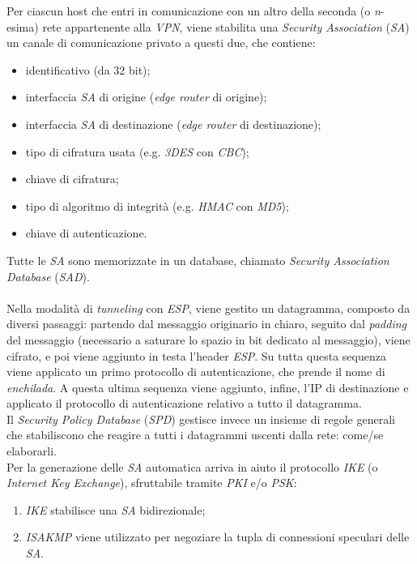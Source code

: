 Per ciascun host che entri in comunicazione con un altro della seconda (o \textit{n}-esima) rete appartenente alla \textit{VPN}, viene stabilita una \textit{Security Association} (\textit{SA}) un canale di comunicazione privato a questi due, che contiene:
\begin{itemize}
	\item identificativo (da 32 bit);
	\item interfaccia \textit{SA} di origine (\textit{edge router} di origine);
	\item interfaccia \textit{SA} di destinazione (\textit{edge router} di destinazione);
	\item tipo di cifratura usata (e.g. \textit{3DES} con \textit{CBC});
	\item chiave di cifratura;
	\item tipo di algoritmo di integrità (e.g. \textit{HMAC} con \textit{MD5});
	\item chiave di autenticazione.
\end{itemize}
Tutte le \textit{SA} sono memorizzate in un database, chiamato \textit{Security Association Database} (\textit{SAD}). \\ \\

Nella modalità di \textit{tunneling} con \textit{ESP}, viene gestito un datagramma, composto da diversi passaggi: partendo dal messaggio originario in chiaro, seguito dal \textit{padding} del messaggio (necessario a saturare lo spazio in bit dedicato al messaggio), viene cifrato, e poi viene aggiunto in testa l'header \textit{ESP}. Su tutta questa sequenza viene applicato un primo protocollo di autenticazione, che prende il nome di \textit{enchilada}. A questa ultima sequenza viene aggiunto, infine, l'IP di destinazione e applicato il protocollo di autenticazione relativo a tutto il datagramma. \\
Il \textit{Security Policy Database} (\textit{SPD}) gestisce invece un insieme di regole generali che stabiliscono che reagire a tutti i datagrammi uscenti dalla rete: come/se elaborarli. \\
Per la generazione delle \textit{SA} automatica arriva in aiuto il protocollo \textit{IKE} (o \textit{Internet Key Exchange}), sfruttabile tramite \textit{PKI} e/o \textit{PSK}:
\begin{enumerate}
	\item \textit{IKE} stabilisce una \textit{SA} bidirezionale;
	\item \textit{ISAKMP} viene utilizzato per negoziare la tupla di connessioni speculari delle \textit{SA}.
\end{enumerate}

